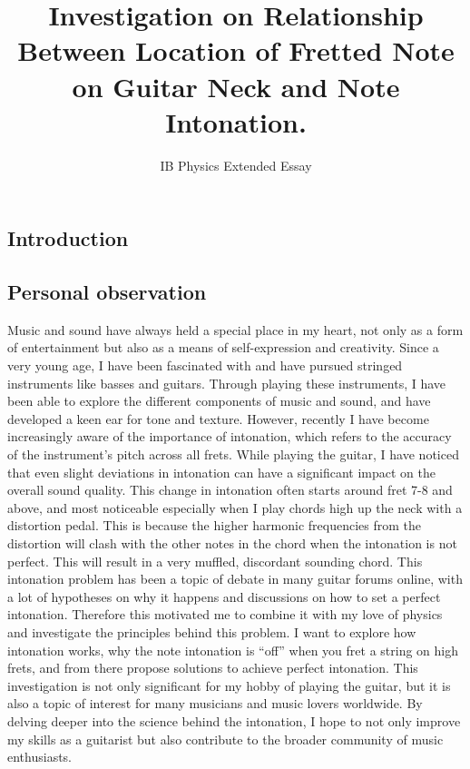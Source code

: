 \documentclass[11pt]{article}
\title{Investigation on Relationship Between Location of Fretted Note on Guitar Neck and Note Intonation.}
\author{IB Physics Extended Essay}
\begin{document}
    \maketitle
    \tableofcontents

    \begin{flushleft}
    \section{Introduction}
        \subsection{Personal observation}
            Music and sound have always held a special place in my heart, not only as a form of entertainment but also as a means of self-expression and creativity. Since a very young age, I have been fascinated with and have pursued stringed instruments like basses and guitars. Through playing these instruments, I have been able to explore the different components of music and sound, and have developed a keen ear for tone and texture. However, recently I have become increasingly aware of the importance of intonation, which refers to the accuracy of the instrument's pitch across all frets. While playing the guitar, I have noticed that even slight deviations in intonation can have a significant impact on the overall sound quality. This change in intonation often starts around fret 7-8 and above, and most noticeable especially when I play chords high up the neck with a distortion pedal. This is because the higher harmonic frequencies from the distortion will clash with the other notes in the chord when the intonation is not perfect. This will result in a very muffled, discordant sounding chord. This intonation problem has been a topic of debate in many guitar forums online, with a lot of hypotheses on why it happens and discussions on how to set a perfect intonation. Therefore this motivated me to combine it with my love of physics and investigate the principles behind this problem. I want to explore how intonation works, why the note intonation is “off” when you fret a string on high frets, and from there propose solutions to achieve perfect intonation. This investigation is not only significant for my hobby of playing the guitar, but it is also a topic of interest for many musicians and music lovers worldwide. By delving deeper into the science behind the intonation, I hope to not only improve my skills as a guitarist but also contribute to the broader community of music enthusiasts.

\end{flushleft}
\end{document}
